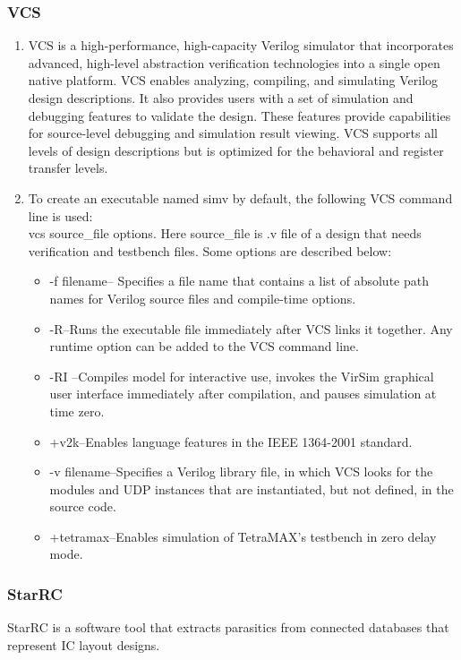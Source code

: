 \documentclass[a4paper,12pt,twoside]{article}
\begin{document}
\subsubsection{VCS}
\begin{enumerate}
    \item VCS is a high-performance, high-capacity Verilog simulator that incorporates advanced, high-level abstraction verification technologies into a single open native platform. VCS enables analyzing, compiling, and simulating Verilog design descriptions. It also provides users with a set of simulation and debugging features to validate the design. These features provide capabilities for source-level debugging and simulation result viewing. VCS supports all levels of design descriptions but is optimized for the behavioral and register transfer levels.
    \item To create an executable named simv by default, the following VCS command line is used:\\
    vcs source\_file options. Here source\_file is .v file of a design that needs verification and testbench files. Some options are described below:
    \begin{itemize}
        \item -f filename-- Specifies a file name that contains a list of absolute path names for Verilog source files and compile-time options.
        \item -R--Runs the executable file immediately after VCS links it together. Any runtime option can be added to the VCS command line.
        \item -RI --Compiles model for interactive use, invokes the VirSim graphical user interface immediately after compilation, and pauses simulation at time zero.
        \item +v2k--Enables language features in the IEEE 1364-2001 standard.
        \item -v filename--Specifies a Verilog library file, in which VCS looks for the modules and UDP instances that are instantiated, but not defined, in the source code.
        \item +tetramax--Enables simulation of TetraMAX’s testbench in zero delay mode.
    \end{itemize}
\end{enumerate}
\subsubsection{StarRC}
StarRC is a software tool that extracts parasitics from connected databases that represent IC layout designs.
\end{document}

